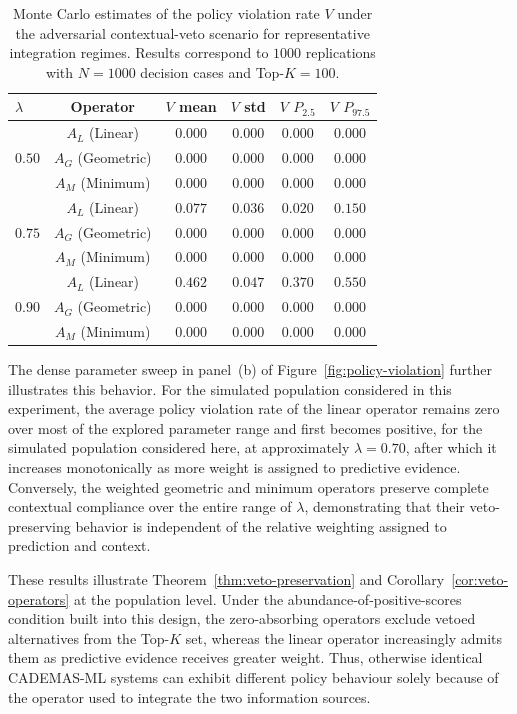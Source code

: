 \documentclass[mathematics,article,submit,moreauthors]{Definitions/mdpi}
\begin{document}
\begin{table}[H]
\caption{Monte Carlo estimates of the policy violation rate $V$ under the adversarial contextual-veto scenario for representative integration regimes. Results correspond to $1000$ replications with $N=1000$ decision cases and Top-$K=100$.}
\label{tab:policy-compliance}
\centering
\small
\renewcommand{\arraystretch}{1.2}
\begin{tabular}{lccccc}
\toprule
$\lambda$ & Operator & $V$ mean & $V$ std & {\color{teal}$V$ $P_{2.5}$} & {\color{teal}$V$ $P_{97.5}$} \\
\midrule
\multirow{3}{*}{$0.50$} & $A_L$ (Linear) & $0.000$ & $0.000$ & $0.000$ & $0.000$ \\
 & $A_G$ (Geometric) & $0.000$ & $0.000$ & $0.000$ & $0.000$ \\
 & $A_M$ (Minimum) & $0.000$ & $0.000$ & $0.000$ & $0.000$ \\
\midrule
\multirow{3}{*}{$0.75$} & $A_L$ (Linear) & $0.077$ & $0.036$ & $0.020$ & $0.150$ \\
 & $A_G$ (Geometric) & $0.000$ & $0.000$ & $0.000$ & $0.000$ \\
 & $A_M$ (Minimum) & $0.000$ & $0.000$ & $0.000$ & $0.000$ \\
\midrule
\multirow{3}{*}{$0.90$} & $A_L$ (Linear) & $0.462$ & $0.047$ & $0.370$ & $0.550$ \\
 & $A_G$ (Geometric) & $0.000$ & $0.000$ & $0.000$ & $0.000$ \\
 & $A_M$ (Minimum) & $0.000$ & $0.000$ & $0.000$ & $0.000$ \\
\bottomrule
\end{tabular}
\end{table}

The dense parameter sweep in panel~(b) of
Figure~\ref{fig:policy-violation} further illustrates this
behavior. For the simulated population considered in this experiment,
the average policy violation rate of the linear operator remains zero over most of the explored parameter range and first becomes positive, for the simulated population considered here, at approximately $\lambda=0.70$, after which it increases monotonically as more weight is assigned to predictive evidence.
Conversely, the weighted geometric and minimum operators preserve
complete contextual compliance over the entire range of $\lambda$,
demonstrating that their veto-preserving behavior is independent of the
relative weighting assigned to prediction and context.

{\color{blue}These results illustrate Theorem~\ref{thm:veto-preservation}
and Corollary~\ref{cor:veto-operators} at the population level. Under the
abundance-of-positive-scores condition built into this design, the
zero-absorbing operators exclude vetoed alternatives from the Top-$K$ set,
whereas the linear operator increasingly admits them as predictive evidence
receives greater weight. Thus, otherwise identical CADEMAS-ML systems can
exhibit different policy behaviour solely because of the operator used to
integrate the two information sources.}
\end{document}
